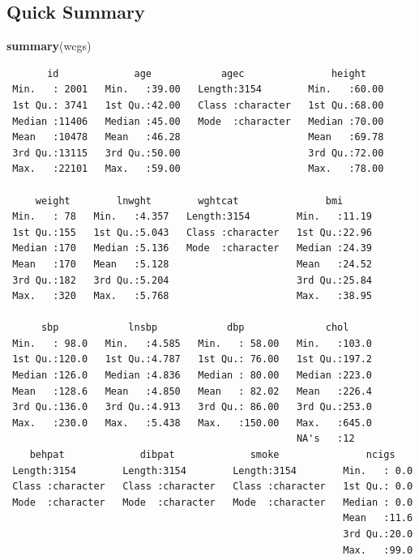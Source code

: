 \documentclass[
]{book}
\newenvironment{Shaded}{\begin{snugshade}}{\end{snugshade}}
\newcommand{\KeywordTok}[1]{\textcolor[rgb]{0.13,0.29,0.53}{\textbf{#1}}}
\newcommand{\NormalTok}[1]{#1}
\begin{document}
\hypertarget{quick-summary}{%
\subsection{Quick Summary}\label{quick-summary}}

\begin{Shaded}
\begin{Highlighting}[]
\KeywordTok{summary}\NormalTok{(wcgs)}
\end{Highlighting}
\end{Shaded}

\begin{verbatim}
       id             age            agec               height     
 Min.   : 2001   Min.   :39.00   Length:3154        Min.   :60.00  
 1st Qu.: 3741   1st Qu.:42.00   Class :character   1st Qu.:68.00  
 Median :11406   Median :45.00   Mode  :character   Median :70.00  
 Mean   :10478   Mean   :46.28                      Mean   :69.78  
 3rd Qu.:13115   3rd Qu.:50.00                      3rd Qu.:72.00  
 Max.   :22101   Max.   :59.00                      Max.   :78.00  
                                                                   
     weight        lnwght        wghtcat               bmi       
 Min.   : 78   Min.   :4.357   Length:3154        Min.   :11.19  
 1st Qu.:155   1st Qu.:5.043   Class :character   1st Qu.:22.96  
 Median :170   Median :5.136   Mode  :character   Median :24.39  
 Mean   :170   Mean   :5.128                      Mean   :24.52  
 3rd Qu.:182   3rd Qu.:5.204                      3rd Qu.:25.84  
 Max.   :320   Max.   :5.768                      Max.   :38.95  
                                                                 
      sbp            lnsbp            dbp              chol      
 Min.   : 98.0   Min.   :4.585   Min.   : 58.00   Min.   :103.0  
 1st Qu.:120.0   1st Qu.:4.787   1st Qu.: 76.00   1st Qu.:197.2  
 Median :126.0   Median :4.836   Median : 80.00   Median :223.0  
 Mean   :128.6   Mean   :4.850   Mean   : 82.02   Mean   :226.4  
 3rd Qu.:136.0   3rd Qu.:4.913   3rd Qu.: 86.00   3rd Qu.:253.0  
 Max.   :230.0   Max.   :5.438   Max.   :150.00   Max.   :645.0  
                                                  NA's   :12     
    behpat             dibpat             smoke               ncigs     
 Length:3154        Length:3154        Length:3154        Min.   : 0.0  
 Class :character   Class :character   Class :character   1st Qu.: 0.0  
 Mode  :character   Mode  :character   Mode  :character   Median : 0.0  
                                                          Mean   :11.6  
                                                          3rd Qu.:20.0  
                                                          Max.   :99.0  
                                                                        

\end{verbatim}
\end{document}
